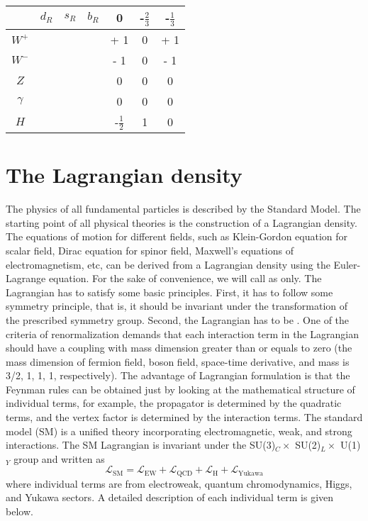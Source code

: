 \begin{table}
\begin{center}
\begin{tabular}{c c c c c c c}
				&$d_R$ & $s_R$ & $b_R$  & 0 & -$\frac{2}{3}$ & -$\frac{1}{3}$\\[0.2cm]\hline
				$W^+$ & & & & + 1 & 0 & + 1 \\[0.2cm]
				$W^-$ & & & & - 1 & 0 & - 1 \\[0.2cm]
				$Z$ & & & & 0 & 0 & 0 \\[0.2cm]
				$\gamma$ & & & & 0 & 0 & 0 \\[0.2cm]
				$H$ & & & & -$\frac{1}{2}$ & 1 & 0 \\[0.2cm]
\hline
\end{tabular}
\end{center}
\end{table}


\section{The Lagrangian density}
\label{s:smLag}
The physics of all fundamental particles is described by the Standard 
Model. The starting point of all physical theories is the 
construction of a Lagrangian density. The equations of motion for 
different fields, such as Klein-Gordon equation for scalar field, Dirac
equation for spinor field, Maxwell's equations of electromagnetism, etc, 
can be derived from a Lagrangian density using the Euler-Lagrange equation. For the
sake of convenience, we will call  as  only.
The Lagrangian has to satisfy some basic principles.
First, it has to follow some symmetry principle, that is, it should be invariant under 
the transformation of the prescribed symmetry group. 
Second, the Lagrangian has to be . One 
of the criteria of renormalization demands that each interaction term in the Lagrangian
should have a coupling with mass dimension greater than or equals to zero 
(the mass dimension of fermion field, boson field, space-time derivative, and mass is 
3/2, 1, 1, 1, respectively). The advantage of Lagrangian formulation is that the Feynman 
rules can be obtained just by looking at the mathematical structure of individual terms, 
for example, the propagator is determined by the quadratic terms, and the vertex factor is 
determined by the interaction terms. The standard model (SM) is a unified theory incorporating 
electromagnetic, weak, and strong interactions. The SM Lagrangian is invariant 
under the SU(3)$_C\times$ SU(2)$_L\times$ U(1)$_Y$ group and written as
\begin{equation}
	\mathcal{L}_{\text{SM}} =  \mathcal{L}_\text{EW} + \mathcal{L}_\text{QCD} +
	\mathcal{L}_\text{H} + \mathcal{L}_\text{Yukawa}
  \label{eq:smLag}
\end{equation}
where individual terms are from electroweak, quantum chromodynamics, Higgs, and
Yukawa sectors. A detailed description of each individual term is given below.

